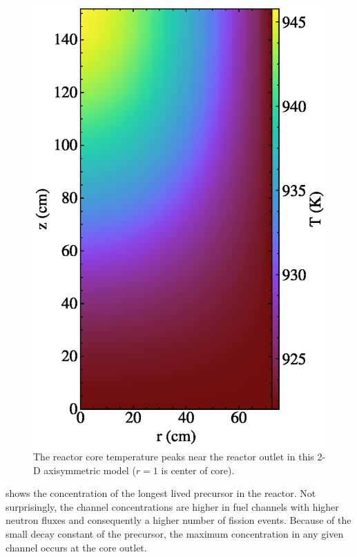 \documentclass{article}
\begin{document}
\begin{figure}
  \centering
  \includegraphics{auto_diff_rho_temp.eps}
        \caption{The reactor core temperature peaks near the reactor outlet 
        in this 2-D axisymmetric model ($r=1$ is center of core).}
  \label{fig:temp}
\end{figure}

 shows the concentration of the longest lived precursor in the
reactor. Not surprisingly, the channel concentrations are higher in fuel channels
with higher neutron fluxes and consequently a higher number of fission
events. Because of the small decay constant of the precursor, the maximum
concentration in any given channel occurs at the core outlet.
\end{document}
